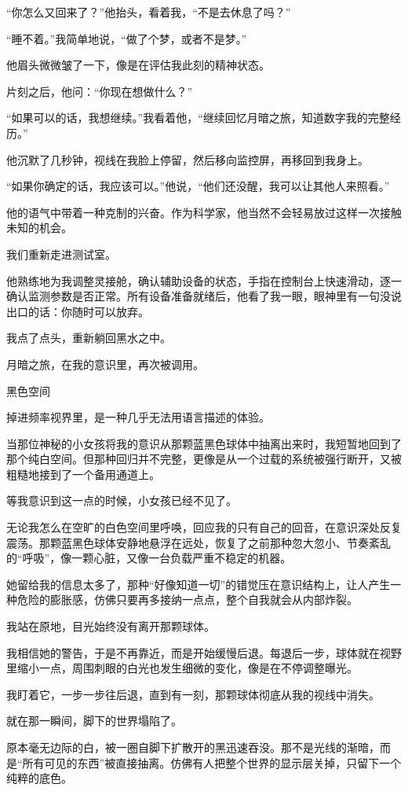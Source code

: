 “你怎么又回来了？”他抬头，看着我，“不是去休息了吗？”

“睡不着。”我简单地说，“做了个梦，或者不是梦。”

他眉头微微皱了一下，像是在评估我此刻的精神状态。

片刻之后，他问：“你现在想做什么？”

“如果可以的话，我想继续。”我看着他，“继续回忆月暗之旅，知道数字我的完整经历。”

他沉默了几秒钟，视线在我脸上停留，然后移向监控屏，再移回到我身上。

“如果你确定的话，我应该可以。”他说，“他们还没醒，我可以让其他人来照看。”

他的语气中带着一种克制的兴奋。作为科学家，他当然不会轻易放过这样一次接触未知的机会。

我们重新走进测试室。

他熟练地为我调整灵接舱，确认辅助设备的状态，手指在控制台上快速滑动，逐一确认监测参数是否正常。所有设备准备就绪后，他看了我一眼，眼神里有一句没说出口的话：你随时可以放弃。

我点了点头，重新躺回黑水之中。

月暗之旅，在我的意识里，再次被调用。

黑色空间

掉进频率视界里，是一种几乎无法用语言描述的体验。

当那位神秘的小女孩将我的意识从那颗蓝黑色球体中抽离出来时，我短暂地回到了那个纯白空间。但那种回归并不完整，更像是从一个过载的系统被强行断开，又被粗糙地接到了一个备用通道上。

等我意识到这一点的时候，小女孩已经不见了。

无论我怎么在空旷的白色空间里呼唤，回应我的只有自己的回音，在意识深处反复震荡。那颗蓝黑色球体安静地悬浮在远处，恢复了之前那种忽大忽小、节奏紊乱的“呼吸”，像一颗心脏，又像一台负载严重不稳定的机器。

她留给我的信息太多了，那种“好像知道一切”的错觉压在意识结构上，让人产生一种危险的膨胀感，仿佛只要再多接纳一点点，整个自我就会从内部炸裂。

我站在原地，目光始终没有离开那颗球体。

我相信她的警告，于是不再靠近，而是开始缓慢后退。每退后一步，球体就在视野里缩小一点，周围刺眼的白光也发生细微的变化，像是在不停调整曝光。

我盯着它，一步一步往后退，直到有一刻，那颗球体彻底从我的视线中消失。

就在那一瞬间，脚下的世界塌陷了。

原本毫无边际的白，被一圈自脚下扩散开的黑迅速吞没。那不是光线的渐暗，而是“所有可见的东西”被直接抽离。仿佛有人把整个世界的显示层关掉，只留下一个纯粹的底色。

